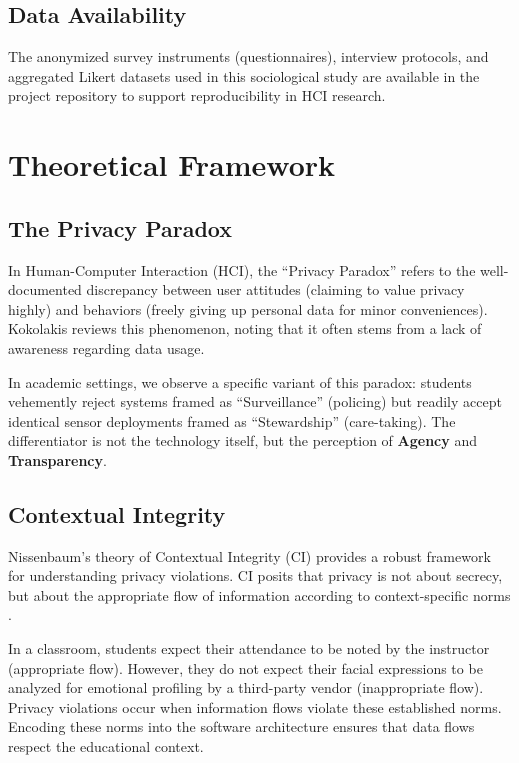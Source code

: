 \documentclass[conference]{IEEEtran}
\begin{document}
\subsection{Data Availability}
The anonymized survey instruments (questionnaires), interview protocols, and aggregated Likert datasets used in this sociological study are available in the project repository \cite{scholarmaster_repo} to support reproducibility in HCI research.

\section{Theoretical Framework}

\subsection{The Privacy Paradox}
In Human-Computer Interaction (HCI), the ``Privacy Paradox'' refers to the well-documented discrepancy between user attitudes (claiming to value privacy highly) and behaviors (freely giving up personal data for minor conveniences). Kokolakis \cite{b3} reviews this phenomenon, noting that it often stems from a lack of awareness regarding data usage.

In academic settings, we observe a specific variant of this paradox: students vehemently reject systems framed as ``Surveillance'' (policing) but readily accept identical sensor deployments framed as ``Stewardship'' (care-taking). The differentiator is not the technology itself, but the perception of \textbf{Agency} and \textbf{Transparency}.

\subsection{Contextual Integrity}
Nissenbaum's theory of Contextual Integrity (CI) provides a robust framework for understanding privacy violations. CI posits that privacy is not about secrecy, but about the appropriate flow of information according to context-specific norms \cite{b4}.

In a classroom, students expect their attendance to be noted by the instructor (appropriate flow). However, they do not expect their facial expressions to be analyzed for emotional profiling by a third-party vendor (inappropriate flow). Privacy violations occur when information flows violate these established norms. Encoding these norms into the software architecture ensures that data flows respect the educational context.
\end{document}

